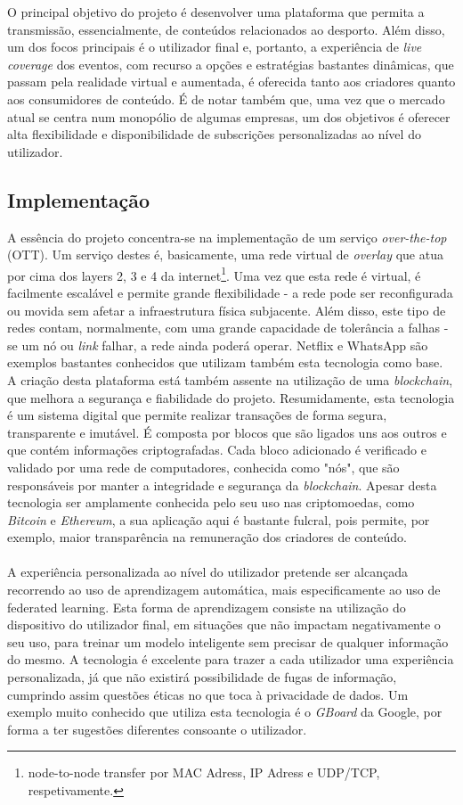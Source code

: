 \documentclass{llncs}
\begin{document}
O principal objetivo do projeto é desenvolver uma plataforma que permita a transmissão, essencialmente, de conteúdos relacionados ao desporto. Além disso, um dos focos principais é o utilizador final e, portanto,  a experiência de \emph{live coverage} dos eventos, com recurso a opções e estratégias bastantes dinâmicas, que passam pela realidade virtual e aumentada, é oferecida tanto aos criadores quanto aos consumidores de conteúdo.
É de notar também que, uma vez que o mercado atual se centra num monopólio de algumas empresas, um dos objetivos é oferecer alta flexibilidade e disponibilidade de subscrições personalizadas ao nível do utilizador.

\subsection{Implementação}

A essência do projeto concentra-se na implementação de um serviço \emph{over-the-top} (OTT). Um serviço destes é, basicamente, uma rede virtual de \emph{overlay} que atua por cima dos layers 2, 3 e 4 da internet\footnote{node-to-node transfer por MAC Adress, IP Adress e UDP/TCP, respetivamente.}. Uma vez que esta rede é virtual, é facilmente escalável e permite grande flexibilidade - a rede pode ser reconfigurada ou movida sem afetar a infraestrutura física subjacente. Além disso, este tipo de redes contam, normalmente, com uma grande capacidade de tolerância a falhas - se um nó ou \emph{link} falhar, a rede ainda poderá operar. Netflix e WhatsApp são exemplos bastantes conhecidos que utilizam também esta tecnologia como base.
\\
A criação desta plataforma está também assente na utilização de uma \emph{blockchain}, que melhora a segurança e fiabilidade do projeto. Resumidamente, esta tecnologia é um sistema digital que permite realizar transações de forma segura, transparente e imutável. É composta por blocos que são ligados uns aos outros e que contém informações criptografadas. Cada bloco adicionado é verificado e validado por uma rede de computadores, conhecida como "nós", que são responsáveis por manter a integridade e segurança da \emph{blockchain}. Apesar desta tecnologia ser amplamente conhecida pelo seu uso nas criptomoedas, como \textit{Bitcoin} e \textit{Ethereum}, a sua aplicação aqui é bastante fulcral, pois permite, por exemplo, maior transparência na remuneração dos criadores de conteúdo.
\\
\\
A experiência personalizada ao nível do utilizador pretende ser alcançada recorrendo ao uso de aprendizagem automática, mais especificamente ao uso de federated learning. Esta forma de aprendizagem consiste na utilização do dispositivo do utilizador final, em situações que não impactam negativamente o seu uso, para treinar um modelo inteligente sem precisar de qualquer informação do mesmo. A tecnologia é excelente para trazer a cada utilizador uma experiência personalizada, já que não existirá possibilidade de fugas de informação, cumprindo assim questões éticas no que toca à privacidade de dados. Um exemplo muito conhecido que utiliza esta tecnologia é o \emph{GBoard} da Google, por forma a ter sugestões diferentes consoante o utilizador.
\end{document}

